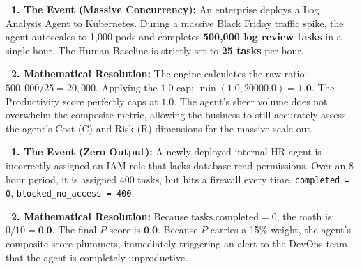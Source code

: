 \documentclass[11pt,a4paper]{article}
\begin{document}
\begin{tcolorbox}[enhanced, colback=dpiblue!5!white, colframe=dpiblue, title={\textbf{\faChartLine\ Scenario 1: The Hyper-Scale Spout}}, fonttitle=\bfseries, boxrule=1pt, arc=2mm, drop shadow]
\textbf{\color{dpiblue}\faServer\ 1. The Event (Massive Concurrency):} 
An enterprise deploys a Log Analysis Agent to Kubernetes. During a massive Black Friday traffic spike, the agent autoscales to 1,000 pods and completes \textbf{500,000 log review tasks} in a single hour. The Human Baseline is strictly set to \textbf{25 tasks} per hour.

\vspace{0.2cm}
\textbf{\color{dpigreen}\faCalculator\ 2. Mathematical Resolution:}
The engine calculates the raw ratio: $500,000 / 25 = 20,000$. 
Applying the $1.0$ cap: $\min(1.0, 20000.0) = \textbf{1.0}$.
The Productivity score perfectly caps at $1.0$. The agent's sheer volume does not overwhelm the composite metric, allowing the business to still accurately assess the agent's Cost (C) and Risk (R) dimensions for the massive scale-out.
\end{tcolorbox}

\vspace{0.5cm}
\begin{tcolorbox}[enhanced, colback=dpired!5!white, colframe=dpired, title={\textbf{\faBan\ Scenario 2: The Bottleneck}}, fonttitle=\bfseries, boxrule=1pt, arc=2mm, drop shadow]
\textbf{\color{dpired}\faNetworkWired\ 1. The Event (Zero Output):} 
A newly deployed internal HR agent is incorrectly assigned an IAM role that lacks database read permissions. Over an 8-hour period, it is assigned 400 tasks, but hits a firewall every time. \texttt{completed = 0}, \texttt{blocked\_no\_access = 400}.

\vspace{0.2cm}
\textbf{\color{dpigreen}\faCalculator\ 2. Mathematical Resolution:}
Because $\text{tasks.completed} = 0$, the math is: $0 / 10 = \textbf{0.0}$.
The final $P$ score is $\textbf{0.0}$. Because $P$ carries a 15\% weight, the agent's composite score plummets, immediately triggering an alert to the DevOps team that the agent is completely unproductive.
\end{tcolorbox}
\end{document}
